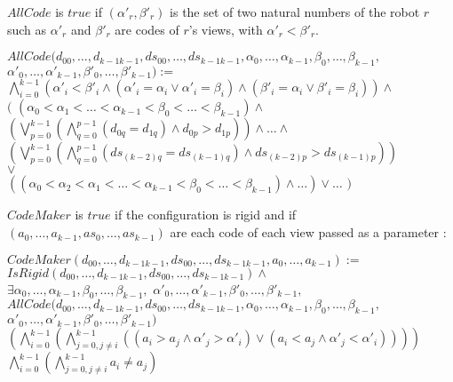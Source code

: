 \documentclass{article}
\begin{document}
$AllCode$ is $true$ if $(\alpha'_{r}, \beta'_{r})$ is the set of two natural numbers of the robot $r$ such as $\alpha'_r$ and $\beta'_r$ are codes of $r$'s views, with $\alpha'_{r} < \beta'_{r}$. 

\begin{center}
$AllCode(d_{00}, \ldots ,d_{k-1k-1}, ds_{00}, \ldots ,ds_{k-1k-1}, \alpha_{0}, \dots, \alpha_{k-1}, \beta_{0}, \dots, \beta_{k-1},$\\
$\alpha'_{0}, \dots, \alpha'_{k-1}, \beta'_{0}, \dots, \beta'_{k-1}) :=$\\
$\bigwedge_{i = 0}^{k-1} \left( \alpha'_{i} < \beta'_{i} \land (\alpha'_{i} = \alpha_{i} \lor \alpha'_{i} = \beta_{i}) \land (\beta'_{i} = \alpha_{i} \lor \beta'_{i} = \beta_{i}) \right) \land $\\
$($
$(\alpha_{0} < \alpha_{1} < \dots < \alpha_{k-1} < \beta_{0} < \dots < \beta_{k-1}) \land $\\
$(\bigvee_{p=0}^{k-1}(\bigwedge_{q=0}^{p-1}(d_{0q} = d_{1q}) \land d_{0p} > d_{1p} ) )\land \dots \land $\\
$(\bigvee_{p=0}^{k-1}(\bigwedge_{q=0}^{p-1}(ds_{(k-2)q} = ds_{(k-1)q}) \land ds_{(k-2)p} > ds_{(k-1)p} ) )$\\
$\lor $\\
$((\alpha_{0} < \alpha_{2} < \alpha_{1} < \dots < \alpha_{k-1} < \beta_{0} < \dots < \beta_{k-1}) \land \dots) \lor \dots$
$)$
\end{center}

$CodeMaker$ is $true$ if the configuration is rigid and if $(a_{0}, \ldots , a_{k-1}, as_{0}, \ldots , as_{k-1})$ are each code of each view passed as a parameter :

\begin{center}
$CodeMaker(d_{00}, \ldots ,d_{k-1k-1}, ds_{00}, \ldots ,ds_{k-1k-1}, a_{0}, \ldots , a_{k-1}):=$\\
$IsRigid(d_{00}, \ldots ,d_{k-1k-1}, ds_{00}, \ldots ,ds_{k-1k-1}) \land $\\
$\exists \alpha_{0}, \dots, \alpha_{k-1}, \beta_{0}, \dots, \beta_{k-1},$
$\alpha'_{0}, \dots, \alpha'_{k-1}, \beta'_{0}, \dots, \beta'_{k-1},$\\
$AllCode(d_{00}, \ldots ,d_{k-1k-1}, ds_{00}, \ldots ,ds_{k-1k-1}, \alpha_{0}, \dots, \alpha_{k-1}, \beta_{0}, \dots, \beta_{k-1}, $\\
$\alpha'_{0}, \dots, \alpha'_{k-1}, \beta'_{0}, \dots, \beta'_{k-1})$\\
$(\bigwedge_{i = 0}^{k-1} (\bigwedge_{j = 0, j\not=i}^{k-1} ((a_{i} > a_{j} \land \alpha'_{j} > \alpha'_{i}) \lor (a_{i} < a_{j} \land \alpha'_{j} < \alpha'_{i}) ) ) )$\\
$\bigwedge_{i=0}^{k-1} (\bigwedge_{j=0, j \not= i}^{k-1} a_{i} \not= a_{j})$
\end{center}
\end{document}
